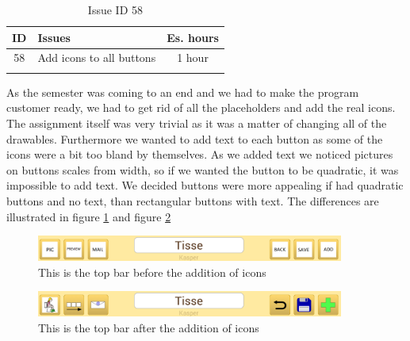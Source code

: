 \begin{longtable} { | c | p{12cm} | c | } 
\hline
	ID 	&	Issues	&		 Es. hours \\\hline
	58	&	Add icons to all buttons	&	1 hour	\\\hline
\caption{Issue ID 58}
\label{tab:spr4_iconstobuttons}
\end{longtable}

As the semester was coming to an end and we had to make the program customer ready, we had to get rid of all the placeholders and add the real icons. The assignment itself was very trivial as it was a matter of changing all of the drawables. Furthermore we wanted to add text to each button as some of the icons were a bit too bland by themselves. As we added text we noticed pictures on buttons scales from width, so if we wanted the button to be quadratic, it was impossible to add text. We decided buttons were more appealing if had quadratic buttons and no text, than rectangular buttons with text. The differences are illustrated in figure \ref{fig:withoutIcons} and figure \ref{fig:withIcons}

\begin{figure} [h!]
\centering
\includegraphics[width=0.9\textwidth]{Pics/Sprint4/topbarshit/withoutIcons.png}
\caption{This is the top bar before the addition of icons}
\label{fig:withoutIcons}
\end{figure}

\begin{figure} [h!]
\centering
\includegraphics[width=0.9\textwidth]{Pics/Sprint4/topbarshit/withIcons.png}
\caption{This is the top bar after the addition of icons}
\label{fig:withIcons}
\end{figure}
